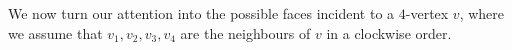 \documentclass[12pt, reqno]{amsart}
\theoremstyle{plain}
\newtheorem{lemma}[equation]{Lemma}
\theoremstyle{definition}
\numberwithin{equation}{section}
\begin{document}
%
%
%
%
%
%
%
%

We now turn our attention into the possible faces incident to a $4$-vertex $v$, where we assume that $v_1,v_2,v_3,v_4$ are the neighbours of $v$ in a clockwise order. 
\end{document}
